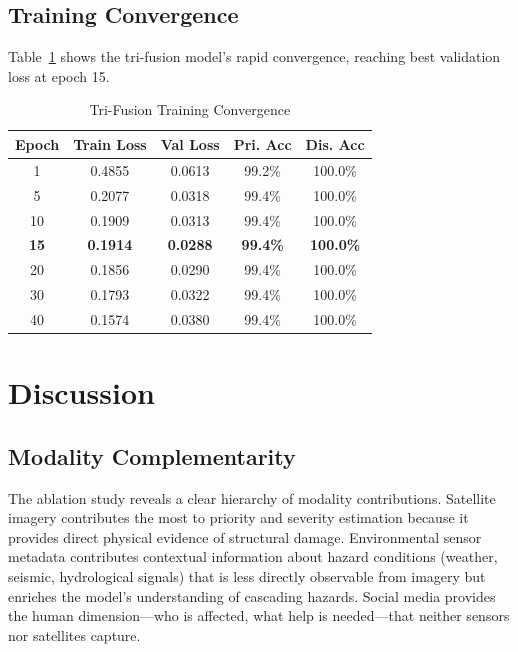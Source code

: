 \documentclass[journal]{IEEEtran}
\begin{document}
\subsection{Training Convergence}

Table~\ref{tab:convergence} shows the tri-fusion model's rapid convergence, reaching best validation loss at epoch 15.

\begin{table}[!t]
\centering
\caption{Tri-Fusion Training Convergence}
\label{tab:convergence}
\begin{tabular}{ccccc}
\toprule
\textbf{Epoch} & \textbf{Train Loss} & \textbf{Val Loss} & \textbf{Pri. Acc} & \textbf{Dis. Acc} \\
\midrule
1  & 0.4855 & 0.0613 & 99.2\% & 100.0\% \\
5  & 0.2077 & 0.0318 & 99.4\% & 100.0\% \\
10 & 0.1909 & 0.0313 & 99.4\% & 100.0\% \\
\textbf{15} & \textbf{0.1914} & \textbf{0.0288} & \textbf{99.4\%} & \textbf{100.0\%} \\
20 & 0.1856 & 0.0290 & 99.4\% & 100.0\% \\
30 & 0.1793 & 0.0322 & 99.4\% & 100.0\% \\
40 & 0.1574 & 0.0380 & 99.4\% & 100.0\% \\
\bottomrule
\end{tabular}
\end{table}

\section{Discussion}

\subsection{Modality Complementarity}

The ablation study reveals a clear hierarchy of modality contributions. Satellite imagery contributes the most to priority and severity estimation because it provides direct physical evidence of structural damage. Environmental sensor metadata contributes contextual information about hazard conditions (weather, seismic, hydrological signals) that is less directly observable from imagery but enriches the model's understanding of cascading hazards. Social media provides the human dimension---who is affected, what help is needed---that neither sensors nor satellites capture.
\end{document}
